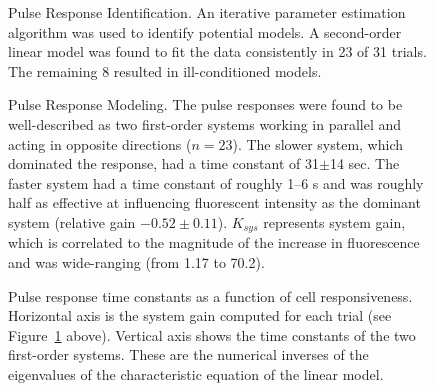 \documentclass[letterpaper]{article}
\begin{document}
\begin{figure}
\centering

\caption{Pulse Response Identification.  An iterative parameter estimation
  algorithm was used to identify potential models.  A second-order linear
  model was found to fit the data consistently in 23 of 31 trials.  The
  remaining 8 resulted in ill-conditioned models. }
\end{figure}

\begin{figure}
\centering

\caption{Pulse Response Modeling.  The pulse responses were found to be
  well-described as two first-order systems working in parallel and acting
  in opposite directions ($n=23$).  The slower system, which dominated the
  response, had a time constant of 31$\pm$14 sec.  The faster system had a
  time constant of roughly 1--6 s and was roughly half as effective at
  influencing fluorescent intensity as the dominant system (relative gain
  $-0.52\pm0.11$).  $K_{sys}$ represents system gain, which is correlated
  to the magnitude of the increase in fluorescence and was
  wide-ranging (from 1.17 to 70.2).}\label{fig:model}
\end{figure}

\begin{figure}
\centering

\caption{Pulse response time constants as a function of cell
  responsiveness.  Horizontal axis is the system gain computed for each
  trial (see Figure~\ref{fig:model} above).  Vertical axis shows the time
  constants of the two first-order systems.  These are the numerical
  inverses of the eigenvalues of the characteristic equation of the linear
  model. }
\end{figure}





\end{document}
